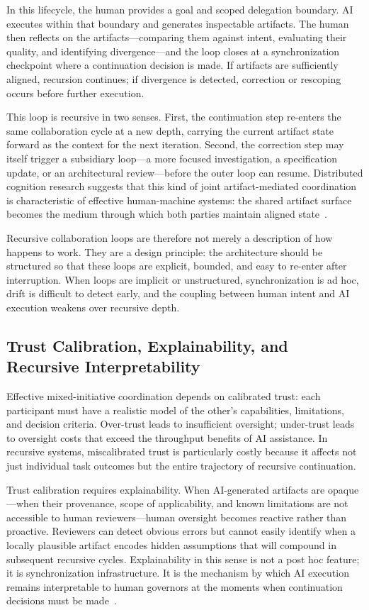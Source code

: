 In this lifecycle, the human provides a goal and scoped delegation boundary. AI executes within that boundary and generates inspectable artifacts. The human then reflects on the artifacts---comparing them against intent, evaluating their quality, and identifying divergence---and the loop closes at a synchronization checkpoint where a continuation decision is made. If artifacts are sufficiently aligned, recursion continues; if divergence is detected, correction or rescoping occurs before further execution.

This loop is recursive in two senses. First, the continuation step re-enters the same collaboration cycle at a new depth, carrying the current artifact state forward as the context for the next iteration. Second, the correction step may itself trigger a subsidiary loop---a more focused investigation, a specification update, or an architectural review---before the outer loop can resume. Distributed cognition research suggests that this kind of joint artifact-mediated coordination is characteristic of effective human-machine systems: the shared artifact surface becomes the medium through which both parties maintain aligned state~\cite{Hutchins1995CognitionWild}.

Recursive collaboration loops are therefore not merely a description of how  happens to work. They are a design principle: the architecture should be structured so that these loops are explicit, bounded, and easy to re-enter after interruption. When loops are implicit or unstructured, synchronization is ad hoc, drift is difficult to detect early, and the coupling between human intent and AI execution weakens over recursive depth.

\subsection{Trust Calibration, Explainability, and Recursive Interpretability}

Effective mixed-initiative coordination depends on calibrated trust: each participant must have a realistic model of the other's capabilities, limitations, and decision criteria. Over-trust leads to insufficient oversight; under-trust leads to oversight costs that exceed the throughput benefits of AI assistance. In recursive systems, miscalibrated trust is particularly costly because it affects not just individual task outcomes but the entire trajectory of recursive continuation.

Trust calibration requires explainability. When AI-generated artifacts are opaque---when their provenance, scope of applicability, and known limitations are not accessible to human reviewers---human oversight becomes reactive rather than proactive. Reviewers can detect obvious errors but cannot easily identify when a locally plausible artifact encodes hidden assumptions that will compound in subsequent recursive cycles. Explainability in this sense is not a post hoc feature; it is synchronization infrastructure. It is the mechanism by which AI execution remains interpretable to human governors at the moments when continuation decisions must be made~\cite{Shneiderman2020HCAI}.

